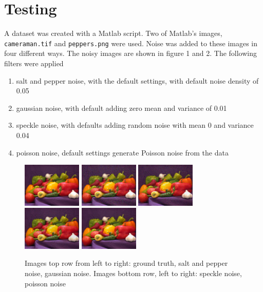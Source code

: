 \documentclass{article}
\begin{document}
\section{Testing}
\label{sec:test}
A dataset was created with a Matlab script. Two of Matlab's images,
\texttt{cameraman.tif} and \texttt{peppers.png} were used. Noise was
added to these images in four different ways. The noisy images are
shown in figure 1 and 2. The following filters
were applied
\begin{enumerate}
  \item salt and pepper noise, with the default settings, with
  default noise density of 0.05
  \item gaussian noise, with default adding zero mean and variance
  of 0.01 
  \item speckle noise, with defaults adding random noise with mean 0
  and variance 0.04 
  \item poisson noise, default settings generate Poisson noise from
  the data
\end{enumerate}
%
\begin{figure}[H]
  \centering
  \includegraphics[width=0.25\textwidth]{images/peps_truth}
  \includegraphics[width=0.25\textwidth]{images/peps_noisy1}
  \includegraphics[width=0.25\textwidth]{images/peps_noisy2}
  \includegraphics[width=0.25\textwidth]{images/peps_noisy3}
  \includegraphics[width=0.25\textwidth]{images/peps_noisy4}
  \caption{Images top row from left to right: ground truth, salt and pepper
    noise, gaussian noise. Images bottom row, left to right: speckle noise, poisson noise}
\end{figure}
\end{document}
